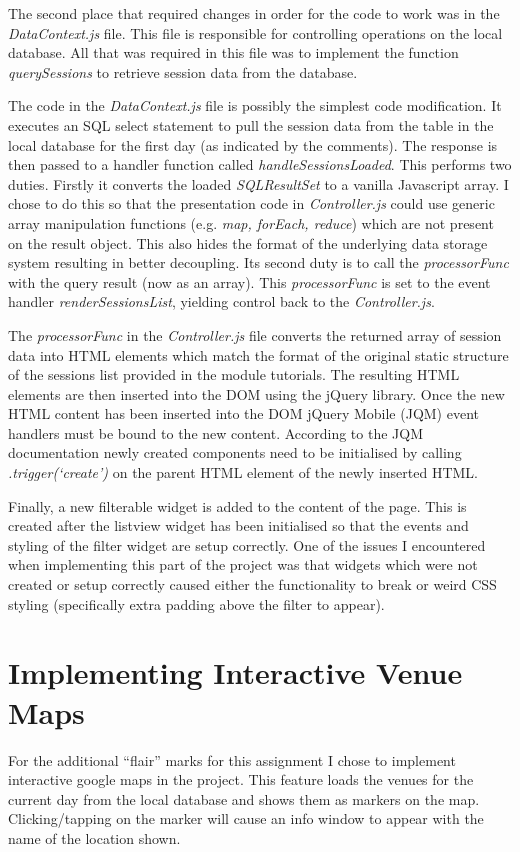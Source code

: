 \documentclass[paper=a4, fontsize=11pt]{scrartcl}	%
\numberwithin{equation}{section}															%
\numberwithin{figure}{section}																%
\numberwithin{table}{section}
\begin{document}
The second place that required changes in order for the code to work was in the \textit{DataContext.js} file. This file is responsible for controlling operations on the local database. All that was required in this file was to implement the function \textit{querySessions} to retrieve session data from the database.

The code in the \textit{DataContext.js} file is possibly the simplest code modification. It executes an SQL select statement to pull the session data from the table in the local database for the first day (as indicated by the comments). The response is then passed to a handler function called \textit{handleSessionsLoaded}. This performs two duties. Firstly it converts the loaded \textit{SQLResultSet} to a vanilla Javascript array. I chose to do this so that the presentation code in \textit{Controller.js} could use generic array manipulation functions (e.g. \textit{map, forEach, reduce}) which are not present on the result object. This also hides the format of the underlying data storage system resulting in better decoupling. Its second duty is to call the \textit{processorFunc} with the query result (now as an array). This \textit{processorFunc} is set to the event handler \textit{renderSessionsList}, yielding control back to the \textit{Controller.js}.

The \textit{processorFunc} in the \textit{Controller.js} file converts the returned array of session data into HTML elements which match the format of the original static structure of the sessions list provided in the module tutorials. The resulting HTML elements are then inserted into the DOM using the jQuery library. Once the new HTML content has been inserted into the DOM jQuery Mobile (JQM) event handlers must be bound to the new content. According to the JQM documentation \cite{jqm-scripting-docs} newly created components need to be initialised by calling \textit{.trigger(`create')} on the parent HTML element of the newly inserted HTML.

Finally, a new filterable widget is added to the content of the page. This is created after the listview widget has been initialised so that the events and styling of the filter widget are setup correctly. One of the issues I encountered when implementing this part of the project was that widgets which were not created or setup correctly caused either the functionality to break or weird CSS styling (specifically extra padding above the filter to appear).


\section{Implementing Interactive Venue Maps}
\label{sec:dynamic-maps}
For the additional ``flair'' marks for this assignment I chose to implement interactive google maps in the project. This feature loads the venues for the current day from the local database and shows them as markers on the map. Clicking/tapping on the marker will cause an info window to appear with the name of the location shown.
\end{document}
